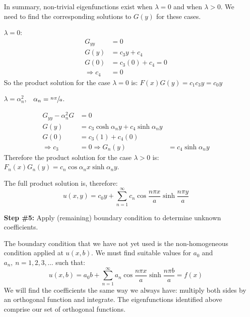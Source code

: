 \vspace{0.25cm}

\noindent In summary, non-trivial eigenfunctions exist when $\lambda = 0$ and when $\lambda >0$.  We need to find the corresponding solutions to $G(y)$ for these cases.

\vspace{0.1cm}

\noindent\underline{$\lambda = 0$}: 
\begin{align*}
G_{yy} &= 0 \\
G(y) &= c_3y + c_4 \\
G(0) &= c_3(0) + c_4 = 0 \\
\Rightarrow c_4 &= 0
\end{align*} 
So the product solution for the case $\lambda = 0$ is: $F(x)G(y) = c_1 c_3y = c_0y$

\vspace{0.25cm}

\noindent\underline{$\lambda = \alpha_n^2$}, $\ \ \alpha_n = \sfrac{n \pi}{a}$.

\begin{align*}
G_{yy} - \alpha_n^2 G &= 0 \\
G(y) &= c_3 \cosh{\alpha_n y} + c_4 \sinh{\alpha_n y} \\
G(0) &= c_3 (1) + c_4(0) \\
\Rightarrow c_3 &= 0
\Rightarrow G_n(y) &= c_4 \sinh{\alpha_n y}
\end{align*}
Therefore the product solution for the case $\lambda > 0$ is: $F_n(x)G_n(y) = c_n \cos{\alpha_n x} \sinh{\alpha_n y}$.

\vspace{0.25cm}

\noindent The full product solution is, therefore:
\begin{equation*}
u(x,y) = c_0y + \sum\limits_{n=1}^{\infty} c_n \cos{\frac{n \pi x}{a}} \sinh{\frac{n \pi y}{a}}
\end{equation*}

\vspace{0.25cm}

\noindent\textbf{Step \#5:} Apply (remaining) boundary condition to determine unknown coefficients.

\vspace{0.25cm}

\noindent The boundary condition that we have not yet used is the non-homogeneous condition applied at $u(x,b)$.  We must find suitable values for $a_0$ and $a_n, \ n=1,2,3,\dots$ such that:
\begin{equation*}
u(x,b) = a_0b + \sum\limits_{n=1}^{\infty}a_n \cos{\frac{n \pi x}{a}}\sinh{\frac{n \pi b}{a}} = f(x)
\end{equation*}
We will find the coefficients the same way we always have: multiply both sides by an orthogonal function and integrate.  The eigenfunctions identified above comprise our set of orthogonal functions.

